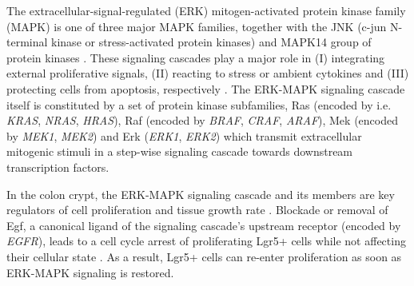\begin{flushleft}
The extracellular-signal-regulated (ERK) mitogen-activated protein kinase family (MAPK) is one of three major MAPK families, together with the JNK (c-jun N-terminal kinase or stress-activated protein kinases) and MAPK14 group of protein kinases \citep{zhangMAPKSignalPathways2002}. These signaling cascades play a major role in (I) integrating external proliferative signals, (II) reacting to stress or ambient cytokines and (III) protecting cells from apoptosis, respectively \citep{fangMAPKSignallingPathways2005}. The ERK-MAPK signaling cascade itself is constituted by a set of protein kinase subfamilies, Ras (encoded by i.e. \textit{KRAS}, \textit{NRAS}, \textit{HRAS}), Raf (encoded by \textit{BRAF}, \textit{CRAF}, \textit{ARAF}), Mek (encoded by \textit{MEK1}, \textit{MEK2}) and Erk (\textit{ERK1}, \textit{ERK2}) which transmit extracellular mitogenic stimuli in a step-wise signaling cascade towards downstream transcription factors. \par

In the colon crypt, the ERK-MAPK signaling cascade and its members are key regulators of cell proliferation and tissue growth rate \citep{hTalesCryptNew2019}. Blockade or removal of Egf, a canonical ligand of the signaling cascade's upstream receptor (encoded by \textit{EGFR}), leads to a cell cycle arrest of proliferating Lgr5+ cells while not affecting their cellular state \citep{basakInducedQuiescenceLgr52017}. As a result, Lgr5+ cells can re-enter proliferation as soon as ERK-MAPK signaling is restored.
\par


\end{flushleft}
